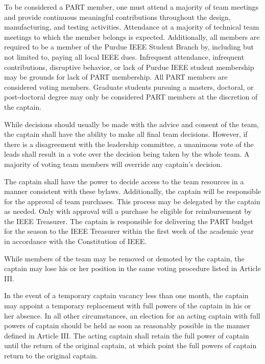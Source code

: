 \documentclass[12pt]{constitution}
\begin{document}
To be considered a PART member, one must attend a majority of team meetings and provide continuous meaningful contributions throughout the design, manufacturing, and testing activities. Attendance at a majority of technical team meetings to which the member belongs is expected. Additionally, all members are required to be a member of the Purdue IEEE Student Branch by, including but not limited to, paying all local IEEE dues. Infrequent attendance, infrequent contributions, disruptive behavior, or lack of Purdue IEEE student membership may be grounds for lack of PART membership. All PART members are considered voting members. Graduate students pursuing a masters, doctoral, or post-doctoral degree may only be considered PART members at the discretion of the captain.


\label{art:decisions}

While decisions should usually be made with the advice and consent of the team, the captain shall have the ability to make all final team decisions. However, if there is a disagreement with the leadership committee, a unanimous vote of the leads shall result in a vote over the decision being taken by the whole team. A majority of voting team members will override any captain’s decision.

The captain shall have the power to decide access to the team resources in a manner consistent with these bylaws. Additionally, the captain will be responsible for the approval of team purchases. This process may be delegated by the captain as needed. Only with approval will a purchase be eligible for reimbursement by the IEEE Treasurer. The captain is responsible for delivering the PART budget for the season to the IEEE Treasurer within the first week of the academic year in accordance with the Constitution of IEEE.

While members of the team may be removed or demoted by the captain, the captain may lose his or her position in the same voting procedure listed in Article III.

In the event of a temporary captain vacancy less than one month, the captain may appoint a temporary replacement with full powers of the captain in his or her absence. In all other circumstances, an election for an acting captain with full powers of captain should be held as soon as reasonably possible in the manner defined in Article III. The acting captain shall retain the full power of captain until the return of the original captain, at which point the full powers of captain return to the original captain.
\end{document}
